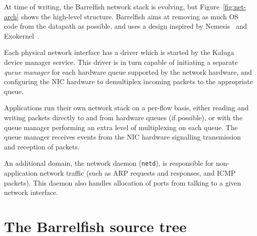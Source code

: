 \documentclass[a4paper,twoside]{report} %
\begin{document}
At time of writing, the Barrelfish network stack is evolving, but
Figure~\ref{fig:net-arch} shows the high-level structure.  Barrelfish
aims at removing as much OS code from the datapath as possible, and
uses a design inspired by Nemesis~\cite{Black:1997:PIV:648046.745222}
and Exokernel~\cite{Ganger:2002:FFA:505452.505455}. 

Each physical network interface has a driver which is started by the
Kaluga device manager service.  This driver is in turn capable of
initiating a separate \emph{queue manager} for each hardware queue
supported by the network hardware, and configuring the NIC hardware to
demultiplex incoming packets to the appropriate queue.  

Applications run their own network stack on a per-flow basis, either
reading and writing packets directly to and from hardware queues (if
possible), or with the queue manager performing an extra level of
multiplexing on each queue.   The queue manager receives events from
the NIC hardware signalling transmission and reception of packets. 

An additional domain, the network daemon (\texttt{netd}), is
responsible for non-application network traffic (such as ARP requests
and responses, and ICMP packets).  This daemon also handles allocation
of ports from talking to a given network interface. 

\chapter{The Barrelfish source tree}\label{chap:sourcetree}

\newenvironment{dirlist}{%
\let\olditem\item%
\renewcommand\item[2][]{\olditem \texttt{##1}:\\[0.3\baselineskip]##2}%
\begin{description}}{\end{description}%
}
\end{document}
